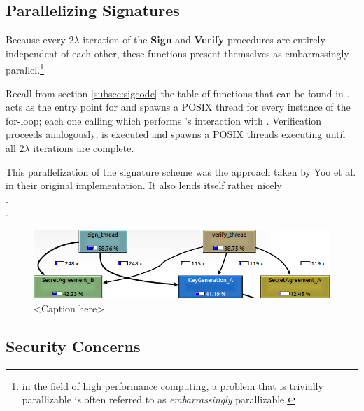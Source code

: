 \subsection{Parallelizing Signatures}

Because every $2\lambda$ iteration of the \textbf{Sign} and \textbf{Verify} procedures are entirely independent of each other, these functions present themselves as embarrassingly parallel.\footnote{in the field of high performance computing, a problem that is trivially parallizable is often referred to as \emph{embarrassingly} parallizable.} 

Recall from section \ref{subsec:sigcode} the table of functions that can be found in .  acts as the entry point for  and spawns a POSIX thread for every instance of the for-loop; each one calling  which performs \bob's interaction with \randall. Verification proceeds analogously;  is executed and spawns a POSIX threads executing  until all $2\lambda$ iterations are complete.

This parallelization of the signature scheme was the approach taken by Yoo et al. in their original implementation. It also lends itself rather nicely\\

\noindent
{}.\\

\noindent
{}.\\

\begin{figure}[htb]
\centering
\includegraphics[scale=0.5]{signandverifycall} %
\caption{<Caption here>}
\label{fig:label} %
\end{figure}

\subsection{Security Concerns}

